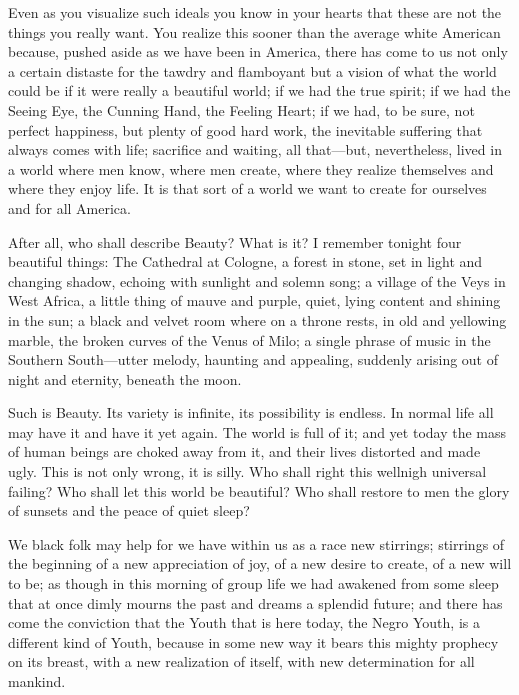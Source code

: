 \documentclass[letterpaper,10pt,english]{jupyterBook}
\begin{document}
\sphinxAtStartPar
Even as you visualize such ideals you know in your hearts that these are not the things you really want. You realize this sooner than the average white American because, pushed aside as we have been in America, there has come to us not only a certain distaste for the tawdry and flamboyant but a vision of what the world could be if it were really a beautiful world; if we had the true spirit; if we had the Seeing Eye, the Cunning Hand, the Feeling Heart; if we had, to be sure, not perfect happiness, but plenty of good hard work, the inevitable suffering that always comes with life; sacrifice and waiting, all that—but, nevertheless, lived in a world where men know, where men create, where they realize themselves and where they enjoy life. It is that sort of a world we want to create for ourselves and for all America.

\sphinxAtStartPar
After all, who shall describe Beauty? What is it? I remember tonight four beautiful things: The Cathedral at Cologne, a forest in stone, set in light and changing shadow, echoing with sunlight and solemn song; a village of the Veys in West Africa, a little thing of mauve and purple, quiet, lying content and shining in the sun; a black and velvet room where on a throne rests, in old and yellowing marble, the broken curves of the Venus of Milo; a single phrase of music in the Southern South—utter melody, haunting and \sphinxhyphen{}appealing, suddenly arising out of night and eternity, beneath the moon.

\sphinxAtStartPar
Such is Beauty. Its variety is infinite, its possibility is endless. In normal life all may have it and have it yet again. The world is full of it; and yet today the mass of human beings are choked away from it, and their lives distorted and made ugly. This is not only wrong, it is silly. Who shall right this well\sphinxhyphen{}nigh universal failing? Who shall let this world be beautiful? Who shall restore to men the glory of sunsets and the peace of quiet sleep?

\sphinxAtStartPar
We black folk may help for we have within us as a race new stirrings; stirrings of the beginning of a new appreciation of joy, of a new desire to create, of a new will to be; as though in this morning of group life we had awakened from some sleep that at once dimly mourns the past and dreams a splendid future; and there has come the conviction that the Youth that is here today, the Negro Youth, is a different kind of Youth, because in some new way it bears this mighty prophecy on its breast, with a new realization of itself, with new determination for all mankind.
\end{document}
